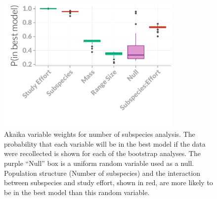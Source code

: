 \begin{knitrout}\footnotesize
{}\color{fgcolor}\begin{figure}[t]

{\centering \includegraphics[width=0.8\textwidth]{figure/ITPlots-1} 

}

\caption[Akaika variable weights for number of subspecies analysis]{Akaika variable weights for number of subspecies analysis. The probability that each variable will be in the best model if the data were recollected is shown for each of the bootstrap analyses. The purple ``Null'' box is a uniform random variable used as a null. Population structure (Number of subspecies) and the interaction between subspecies and study effort, shown in red, are more likely to be in the best model than this random variable.}\label{fig:ITPlots}
\end{figure}


\end{knitrout}






\clearpage





























